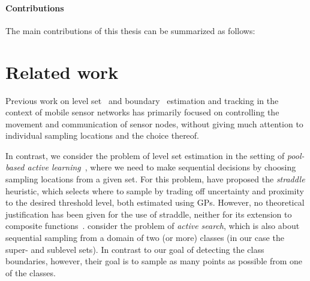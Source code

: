 \paragraph{Contributions}
The main contributions of this thesis can be summarized as follows:

\section{Related work}
Previous work on level set~\cite{dantu07,srinivasan08} and
boundary~\cite{singh06} estimation and tracking in the context of mobile
sensor networks has primarily focused on controlling the movement and
communication of sensor nodes, without giving much attention to
individual sampling locations and the choice thereof.

In contrast, we consider the problem of level set estimation in the setting of
\emph{pool-based active learning}~\cite{settles09}, where we need to make
sequential decisions by choosing sampling locations from a given set.
For this problem, \citet{bryan05} have proposed the
\emph{straddle} heuristic, which selects where to sample by trading off
uncertainty and proximity to the desired threshold level, both estimated
using GPs.
However, no theoretical justification has been given for the use of straddle,
neither for its extension to composite functions~\cite{bryan08}.
\citet{garnett12} consider the problem of
\emph{active search}, which is also about sequential sampling from a domain of
two (or more) classes (in our case the super- and sublevel sets).
In contrast to our goal of detecting the class boundaries, however,
their goal is to sample as many points as possible from one of the classes.


